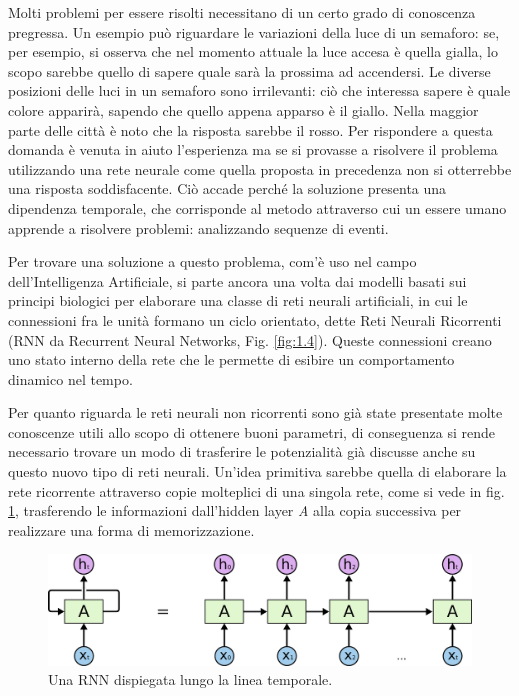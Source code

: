 Molti problemi per essere risolti necessitano di un certo grado di conoscenza pregressa. Un esempio può riguardare le variazioni della luce di un semaforo: se, per esempio, si osserva che nel momento attuale la luce accesa è quella gialla, lo scopo sarebbe quello di sapere quale sarà la prossima ad accendersi. Le diverse posizioni delle luci in un semaforo sono irrilevanti: ciò che interessa sapere è quale colore apparirà, sapendo che quello appena apparso è il giallo. Nella maggior parte delle città è noto che la risposta sarebbe il rosso. Per rispondere a questa domanda è venuta in aiuto l'esperienza ma se si provasse a risolvere il problema utilizzando una rete neurale come quella proposta in precedenza non si otterrebbe una risposta soddisfacente. Ciò accade perché la soluzione presenta una dipendenza temporale, che corrisponde al metodo attraverso cui un essere umano apprende a risolvere problemi: analizzando sequenze di eventi.

Per trovare una soluzione a questo problema, com'è uso nel campo dell'Intelligenza Artificiale, si parte ancora una volta dai modelli basati sui principi biologici per elaborare una classe di reti neurali artificiali, in cui le connessioni fra le unità formano un ciclo orientato, dette Reti Neurali Ricorrenti (RNN da Recurrent Neural Networks, Fig. \ref{fig:1.4}). Queste connessioni creano uno stato interno della rete che le permette di esibire un comportamento dinamico nel tempo.

Per quanto riguarda le reti neurali non ricorrenti sono già state presentate molte conoscenze utili allo scopo di ottenere buoni parametri, di conseguenza si rende necessario trovare un modo di trasferire le potenzialità già discusse anche su questo nuovo tipo di reti neurali. Un'idea primitiva sarebbe quella di elaborare la rete ricorrente attraverso copie molteplici di una singola rete, come si vede in fig. \ref{fig:1.5}, trasferendo le informazioni dall'hidden layer \textit{A} alla copia successiva per realizzare una forma di memorizzazione.

\begin{figure}[ht]
	\centering
	\includegraphics{img/unrolled_rnn.png}
	\caption{Una RNN dispiegata lungo la linea temporale.}
	\label{fig:1.5}
\end{figure}

